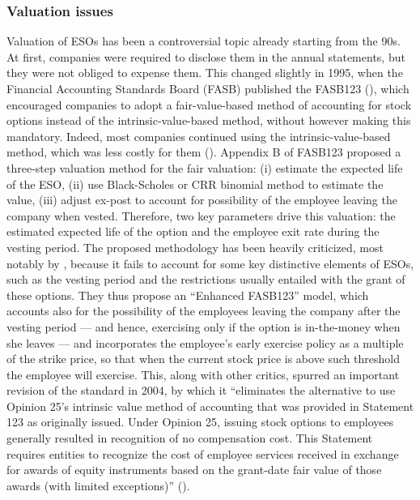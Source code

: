 \subsubsection{Valuation issues}
    Valuation of ESOs has been a controversial topic already starting from the 90s. At first, companies were required to disclose them in the annual statements, but they were not obliged to expense them. This changed slightly in 1995, when the Financial Accounting Standards Board (FASB) published the FASB123 (\cite{fasb123}), which encouraged companies to adopt a fair-value-based method of accounting for stock options instead of the intrinsic-value-based method, without however making this mandatory. Indeed, most companies continued using the intrinsic-value-based method, which was less costly for them (\cite{hull2004value}). 
    Appendix B of FASB123 proposed a three-step valuation method for the fair valuation: (i) estimate the expected life of the ESO, (ii) use Black-Scholes or CRR binomial method to estimate the value, (iii) adjust ex-post to account for possibility of the employee leaving the company when vested. Therefore, two key parameters drive this valuation: the estimated expected life of the option and the employee exit rate during the vesting period. The proposed methodology has been heavily criticized, most notably by \cite{hull2004value}, because it fails to account for some key distinctive elements of ESOs, such as the vesting period and the restrictions usually entailed with the grant of these options. They thus propose an ``Enhanced FASB123'' model, which accounts also for the possibility of the employees leaving the company after the vesting period --- and hence, exercising only if the option is in-the-money when she leaves --- and incorporates the employee's early exercise policy as a multiple of the strike price, so that when the current stock price is above such threshold the employee will exercise. 
    This, along with other critics, spurred an important revision of the standard in 2004, by which it ``eliminates the alternative to use Opinion 25’s intrinsic value method of accounting that was provided in Statement 123 as originally issued. Under Opinion 25, issuing stock options to employees generally resulted in recognition of no compensation cost. This Statement requires entities to recognize the cost of employee services received in exchange for awards of equity instruments based on the grant-date fair value of those awards (with limited exceptions)'' (\cite{fasb123_revised}).
